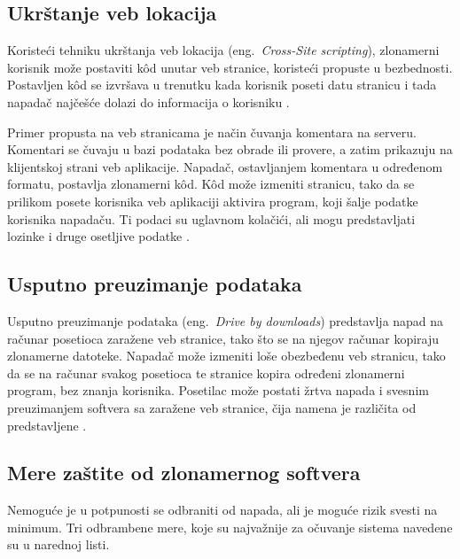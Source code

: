 \documentclass[a4paper]{article}
\begin{document}
\subsection{Ukrštanje veb lokacija}

Koristeći tehniku ukrštanja veb lokacija (eng.~{\em Cross-Site scripting}), zlonamerni korisnik može postaviti kôd unutar veb stranice, koristeći propuste u bezbednosti. Postavljen kôd se izvršava u trenutku kada korisnik poseti datu stranicu i tada napadač najčešće dolazi do informacija o korisniku \cite{ethics,xss}.

Primer propusta na veb stranicama je način čuvanja komentara na serveru. Komentari se čuvaju u bazi podataka bez obrade ili provere, a zatim prikazuju na klijentskoj strani veb aplikacije. Napadač, ostavljanjem komentara u određenom formatu, postavlja zlonamerni kôd. Kôd može izmeniti stranicu, tako da se prilikom posete korisnika veb aplikaciji aktivira program, koji šalje podatke korisnika napadaču. Ti podaci su uglavnom kolačići, ali mogu predstavljati lozinke i druge osetljive podatke \cite{xss}.

\subsection{Usputno preuzimanje podataka }

Usputno preuzimanje podataka (eng.~{\em Drive by downloads}) predstavlja napad na računar posetioca zaražene veb stranice, tako što se na njegov računar kopiraju zlonamerne datoteke. Napadač može izmeniti loše obezbeđenu veb stranicu, tako da se na računar svakog posetioca te stranice kopira određeni zlonamerni program, bez znanja korisnika. Posetilac može postati žrtva napada i svesnim preuzimanjem softvera sa zaražene veb stranice, čija namena je različita od predstavljene \cite{drivebydownloads, ethics}.

\subsection{Mere zaštite od zlonamernog softvera}

Nemoguće je u potpunosti se odbraniti od napada, ali je moguće rizik svesti na minimum. Tri odbrambene mere, koje su najvažnije za očuvanje sistema navedene su u narednoj listi. 
\end{document}
